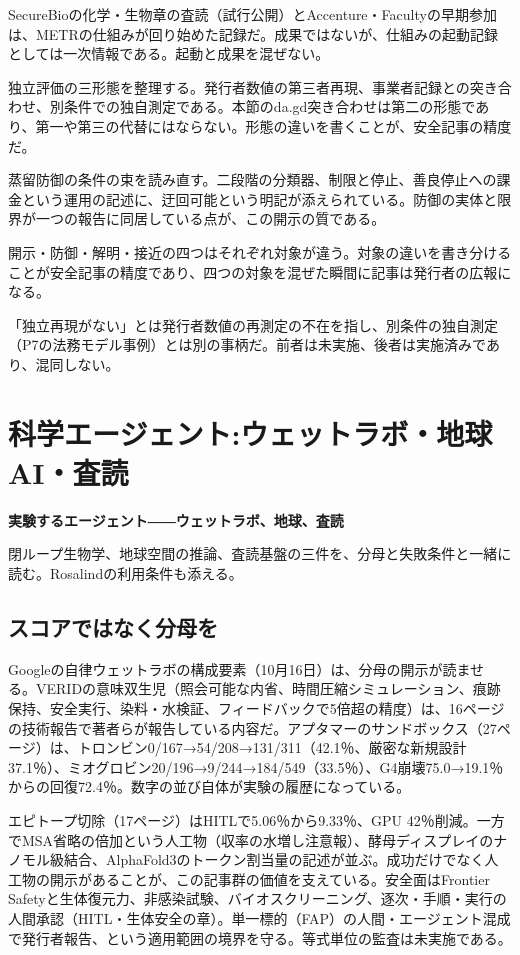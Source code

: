 \documentclass[lualatex,a4paper,10pt]{jlreq}
\begin{document}
SecureBioの化学・生物章の査読（試行公開）とAccenture・Facultyの早期参加は、METRの仕組みが回り始めた記録だ。成果ではないが、仕組みの起動記録としては一次情報である。起動と成果を混ぜない。
\cite{B39,B82}


独立評価の三形態を整理する。発行者数値の第三者再現、事業者記録との突き合わせ、別条件での独自測定である。本節のda.gd突き合わせは第二の形態であり、第一や第三の代替にはならない。形態の違いを書くことが、安全記事の精度だ。
\cite{B40,B79}


蒸留防御の条件の束を読み直す。二段階の分類器、制限と停止、善良停止への課金という運用の記述に、迂回可能という明記が添えられている。防御の実体と限界が一つの報告に同居している点が、この開示の質である。
\cite{B41,B80}


開示・防御・解明・接近の四つはそれぞれ対象が違う。対象の違いを書き分けることが安全記事の精度であり、四つの対象を混ぜた瞬間に記事は発行者の広報になる。
\cite{B40,B79,B41,B80,B42,B81,B39,B82}


「独立再現がない」とは発行者数値の再測定の不在を指し、別条件の独自測定（P7の法務モデル事例）とは別の事柄だ。前者は未実施、後者は実施済みであり、混同しない。


\section{科学エージェント:ウェットラボ・地球AI・査読}
\label{sec:P6}

{\Large\bfseries 実験するエージェント――ウェットラボ、地球、査読\par}
\smallskip
{\color{SurveyMuted}閉ループ生物学、地球空間の推論、査読基盤の三件を、分母と失敗条件と一緒に読む。Rosalindの利用条件も添える。\par}
\bigskip

\subsection*{スコアではなく分母を}

Googleの自律ウェットラボの構成要素（10月16日）は、分母の開示が読ませる。VERIDの意味双生児（照会可能な内省、時間圧縮シミュレーション、痕跡保持、安全実行、染料・水検証、フィードバックで5倍超の精度）は、16ページの技術報告で著者らが報告している内容だ。アプタマーのサンドボックス（27ページ）は、トロンビン0/167→54/208→131/311（42.1％、厳密な新規設計37.1％）、ミオグロビン20/196→9/244→184/549（33.5％）、G4崩壊75.0→19.1％からの回復72.4％。数字の並び自体が実験の履歴になっている。
\cite{B46,B83,B44,B43,B45}


エピトープ切除（17ページ）はHITLで5.06％から9.33％、GPU 42％削減。一方でMSA省略の倍加という人工物（収率の水増し注意報）、酵母ディスプレイのナノモル級結合、AlphaFold3のトークン割当量の記述が並ぶ。成功だけでなく人工物の開示があることが、この記事群の価値を支えている。安全面はFrontier Safetyと生体復元力、非感染試験、バイオスクリーニング、逐次・手順・実行の人間承認（HITL・生体安全の章）。単一標的（FAP）の人間・エージェント混成で発行者報告、という適用範囲の境界を守る。等式単位の監査は未実施である。
\cite{B46,B83,B44,B43,B45}
\end{document}
